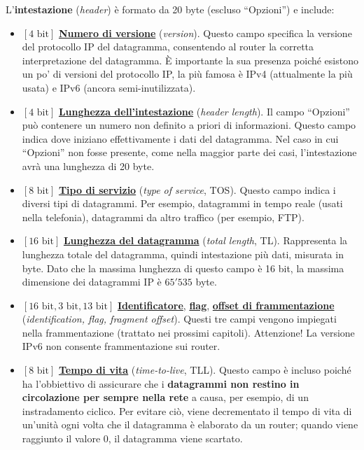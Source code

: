 \documentclass[a4paper]{article}
\newcommand{\dquotes}[1]{``#1''}
\begin{document}
	\newpage\noindent
	L'\textbf{intestazione} (\emph{header}) è formato da 20 byte (escluso \dquotes{Opzioni}) e include:
	\begin{itemize}
		\item $\left[4\text{ bit}\right]$ \underline{\textbf{Numero di versione}} (\emph{version}). Questo campo specifica la versione del protocollo IP del datagramma, consentendo al router la corretta interpretazione del datagramma. È importante la sua presenza poiché esistono un po' di versioni del protocollo IP, la più famosa è IPv4 (attualmente la più usata) e IPv6 (ancora semi-inutilizzata).
		
		\item $\left[4\text{ bit}\right]$ \underline{\textbf{Lunghezza dell'intestazione}} (\emph{header length}). Il campo \dquotes{Opzioni} può contenere un numero non definito a priori di informazioni. Questo campo indica dove iniziano effettivamente i dati del datagramma. Nel caso in cui \dquotes{Opzioni} non fosse presente, come nella maggior parte dei casi, l’intestazione avrà una lunghezza di 20 byte.
		
		\item $\left[8\text{ bit}\right]$ \underline{\textbf{Tipo di servizio}} (\emph{type of service}, TOS). Questo campo indica i diversi tipi di datagrammi. Per esempio, datagrammi in tempo reale (usati nella telefonia), datagrammi da altro traffico (per esempio, FTP).
		
		\item $\left[16\text{ bit}\right]$ \underline{\textbf{Lunghezza del datagramma}} (\emph{total length}, TL). Rappresenta la lunghezza totale del datagramma, quindi intestazione più dati, misurata in byte. Dato che la massima lunghezza di questo campo è 16 bit, la massima dimensione dei datagrammi IP è $65'535$ byte.
		
		\item $\left[16\text{ bit}, 3\text{ bit}, 13\text{ bit}\right]$ \underline{\textbf{Identificatore}}, \underline{\textbf{flag}}, \underline{\textbf{offset di frammentazione}} (\emph{identification, flag, fragment offset}). Questi tre campi vengono impiegati nella frammentazione (trattato nei prossimi capitoli). Attenzione! La versione IPv6 non consente frammentazione sui router.
		
		\item $\left[8\text{ bit}\right]$ \underline{\textbf{Tempo di vita}} (\emph{time-to-live}, TLL). Questo campo è incluso poiché ha l’obbiettivo di assicurare che i \textbf{datagrammi non restino in circolazione per sempre nella rete} a causa, per esempio, di un instradamento ciclico. Per evitare ciò, viene decrementato il tempo di vita di un’unità ogni volta che il datagramma è elaborato da un router; quando viene raggiunto il valore 0, il datagramma viene scartato.
		

\end{itemize}
\end{document}
